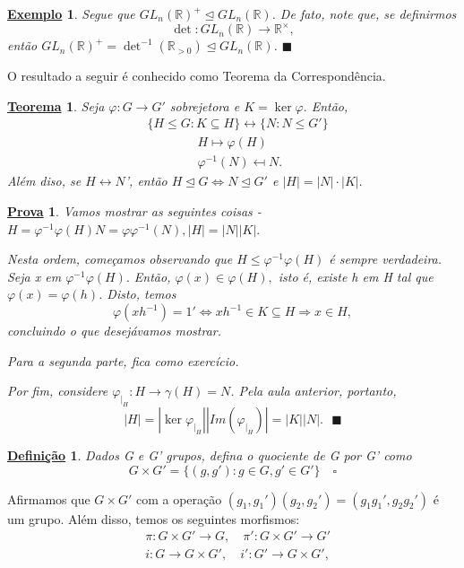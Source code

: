 \documentclass{article}
\newtheorem*{def*}{\underline{Defini\c c\~ao}}
\newtheorem*{theorem*}{\underline{Teorema}}
\newtheorem{example*}{\underline{Exemplo}}
\newtheorem*{proof*}{\underline{Prova}}
\renewcommand\qedsymbol{$\blacksquare$}
\begin{document}
\begin{example*}
  Segue que $GL_{n}(\mathbb{R})^{+}\trianglelefteq{GL_{n}(\mathbb{R})}$. De fato, note que, se definirmos
    $$
      \det:GL_{n}(\mathbb{R})\rightarrow \mathbb{R}^{\times},
    $$
    ent\~ao $GL_{n}(\mathbb{R})^{+} = \det^{-1}(\mathbb{R}_{>0})\trianglelefteq{GL_{n}(\mathbb{R})}$. \qedsymbol
\end{example*}
  O resultado a seguir \'e conhecido como Teorema da Correspond\^encia.
\begin{theorem*}
  Seja $\varphi:G\rightarrow G'$ sobrejetora e $K=\ker{\varphi}.$ Ent\~ao,  
  \begin{align*}
    &\{H\leq{G}: K \subseteq{H}\} \longleftrightarrow \{N: N\leq{G'}\}\\
    &\quad\quad\quad\quad H\mapsto \varphi(H)\\
    &\quad\quad\quad\quad \varphi^{-1}(N)\mapsfrom N.
  \end{align*}
  Al\'em diso, se $H\leftrightarrow N$', ent\~ao $H\trianglelefteq{G} \Longleftrightarrow N\trianglelefteq{G'}$ e
  $|H| = |N|\cdot|K|.$
\end{theorem*}
\begin{proof*}
  Vamos mostrar as seguintes coisas - $H = \varphi^{-1}\varphi(H) N = \varphi \varphi^{-1}(N), |H|=|N||K|.$ 

  Nesta ordem, come\c camos observando que $H\leq{\varphi^{-1}\varphi(H)}$ \'e sempre verdadeira. Seja x em $\varphi^{-1}\varphi(H).$
  Ent\~ao, $\varphi(x)\in\varphi(H),$ isto \'e, existe h em H tal que $\varphi(x) = \varphi(h)$. Disto, temos 
    $$
      \varphi(xh^{-1}) = 1' \Longleftrightarrow xh^{-1}\in K\subseteq{H} \Rightarrow x\in H,
    $$
  concluindo o que desej\'avamos mostrar.

  Para a segunda parte, fica como exerc\'icio.

  Por fim, considere $\varphi_{|_{H}}:H\rightarrow \gamma(H) = N$. Pela aula anterior, portanto,
    $$
    |H| = |\ker{\varphi_{|_{H}}}||Im(\varphi_{|_{H}})| = |K||N|.\text{ \qedsymbol}
    $$
\end{proof*}
\begin{def*}
  Dados G e G' grupos, defina o quociente de G por G' como 
    $$
    G\times{G'} = \{(g, g'): g\in G, g'\in G'\}\quad\square
    $$
\end{def*}
  Afirmamos que $G\times{G'}$ com a opera\c c\~ao $(g_{1}, g_{1}')(g_{2}, g_{2}') = (g_{1}g_{1}', g_{2}g_{2}')$ \'e um grupo.
Al\'em disso, temos os seguintes morfismos:
 \begin{align*}
   & \pi:G\times{G'}\rightarrow G,\quad \pi':G\times{G'}\rightarrow G'\\
   &  i:G\rightarrow G\times{G'},\quad i':G'\rightarrow G\times{G'},
 \end{align*}
\end{document}
